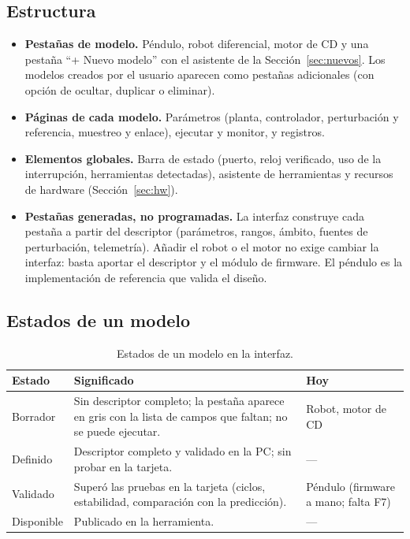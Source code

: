 \documentclass[12pt,letterpaper]{article}
\begin{document}
\subsection{Estructura}

\begin{itemize}
    \item \textbf{Pestañas de modelo.} Péndulo, robot diferencial, motor de CD y una pestaña ``+ Nuevo modelo'' con el asistente de la Sección~\ref{sec:nuevos}. Los modelos creados por el usuario aparecen como pestañas adicionales (con opción de ocultar, duplicar o eliminar).
    \item \textbf{Páginas de cada modelo.} Parámetros (planta, controlador, perturbación y referencia, muestreo y enlace), ejecutar y monitor, y registros.
    \item \textbf{Elementos globales.} Barra de estado (puerto, reloj verificado, uso de la interrupción, herramientas detectadas), asistente de herramientas y recursos de hardware (Sección~\ref{sec:hw}).
    \item \textbf{Pestañas generadas, no programadas.} La interfaz construye cada pestaña a partir del descriptor (parámetros, rangos, ámbito, fuentes de perturbación, telemetría). Añadir el robot o el motor no exige cambiar la interfaz: basta aportar el descriptor y el módulo de firmware. El péndulo es la implementación de referencia que valida el diseño.
\end{itemize}

\subsection{Estados de un modelo}

\begin{table}[!htbp]
\centering
\caption{Estados de un modelo en la interfaz.}
\label{tab:estados}
\begin{tabularx}{\textwidth}{>{\raggedright\arraybackslash}p{2.4cm}Y>{\raggedright\arraybackslash}p{4.0cm}}
\toprule
\textbf{Estado} & \textbf{Significado} & \textbf{Hoy} \\
\midrule
Borrador & Sin descriptor completo; la pestaña aparece en gris con la lista de campos que faltan; no se puede ejecutar. & Robot, motor de CD \\
Definido & Descriptor completo y validado en la PC; sin probar en la tarjeta. & --- \\
Validado & Superó las pruebas en la tarjeta (ciclos, estabilidad, comparación con la predicción). & Péndulo (firmware a mano; falta F7) \\
Disponible & Publicado en la herramienta. & --- \\
\bottomrule
\end{tabularx}
\end{table}
\end{document}
